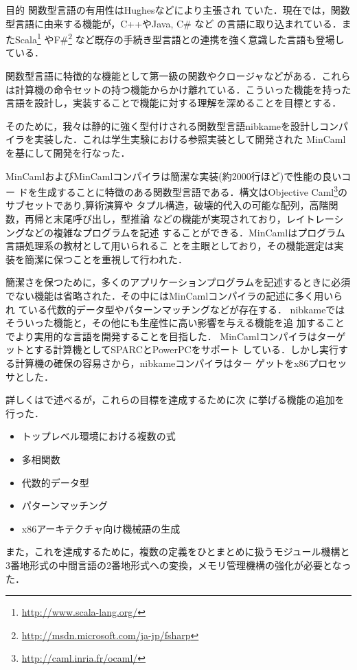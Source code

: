 \documentclass[a4paper,titlepage,report]{jsbook}
\begin{document}
\begin{resbonsiblesection}{目的}{\kobori}
関数型言語の有用性はHughes\cite{hughes1989functional}などにより主張され
ていた．現在では，関数型言語に由来する機能が，C++やJava, C\# など
の言語に取り込まれている．またScala\footnote{\url{http://www.scala-lang.org/}}
やF\#{}\footnote{\url{http://msdn.microsoft.com/ja-jp/fsharp}}
など既存の手続き型言語との連携を強く意識した言語も登場している．

関数型言語に特徴的な機能として第一級の関数やクロージャなどがある．これら
は計算機の命令セットの持つ機能からかけ離れている．こういった機能を持った
言語を設計し，実装することで機能に対する理解を深めることを目標とする．

そのために，我々は静的に強く型付けされる関数型言語nibkameを設計しコンパ
イラを実装した．これは学生実験における参照実装として開発された
MinCaml\cite{住井英二郎:2008-04-24}を基にして開発を行なった．

MinCamlおよびMinCamlコンパイラは簡潔な実装(約2000行ほど)で性能の良いコー
ドを生成することに特徴のある関数型言語である．構文はObjective
Caml\footnote{\url{http://caml.inria.fr/ocaml/}}のサブセットであり,算術演算や
タプル構造，破壊的代入の可能な配列，高階関数，再帰と末尾呼び出し，型推論
などの機能が実現されており，レイトレーシングなどの複雑なプログラムを記述
することができる．MinCamlはプログラム言語処理系の教材として用いられるこ
とを主眼としており，その機能選定は実装を簡潔に保つことを重視して行われた．

簡潔さを保つために，多くのアプリケーションプログラムを記述するときに必須
でない機能は省略された．その中にはMinCamlコンパイラの記述に多く用いられ
ている代数的データ型やパターンマッチングなどが存在する．
nibkameではそういった機能と，その他にも生産性に高い影響を与える機能を追
加することでより実用的な言語を開発することを目指した．
MinCamlコンパイラはターゲットとする計算機としてSPARCとPowerPCをサポート
している．しかし実行する計算機の確保の容易さから，nibkameコンパイラはター
ゲットをx86プロセッサとした．

詳しくはで述べるが，これらの目標を達成するために次
に挙げる機能の追加を行った．
\begin{itemize}
 \item トップレベル環境における複数の式
 \item 多相関数
 \item 代数的データ型
 \item パターンマッチング
 \item x86アーキテクチャ向け機械語の生成
\end{itemize}
また，これを達成するために，複数の定義をひとまとめに扱うモジュール機構と
3番地形式の中間言語の2番地形式への変換，メモリ管理機構の強化が必要となっ
た．
\end{resbonsiblesection}
\end{document}
